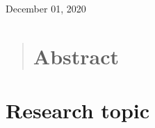 \documentclass[
11pt, %
oneside, %
english, %
onehalfspacing,%
headsepline, %
]{MastersDoctoralThesis} %
\begin{document}
\begin{titlepage}
\begin{center}

\centerline{\large \subjectname}
{\large December 01, 2020}\\[2cm] %
\vfill
\end{center}
\end{titlepage}








\begin{abstract}
  \chapter*{Abstract}

\end{abstract}

\vspace*{50px}
\bigskip


\tableofcontents
\newpage

\listoffigures
\newpage


\chapter*{Research topic}
\end{document}
